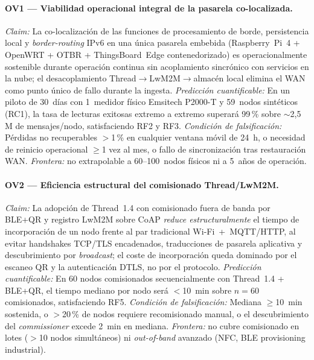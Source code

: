 \paragraph{OV1 --- Viabilidad operacional integral de la pasarela co-localizada.}
\emph{Claim:} La co-localización de las funciones de procesamiento de borde, persistencia local y \emph{border-routing} IPv6 en una única pasarela embebida (Raspberry~Pi~4 + OpenWRT + OTBR + ThingsBoard~Edge contenedorizado) es operacionalmente sostenible durante operación continua sin acoplamiento sincrónico con servicios en la nube; el desacoplamiento Thread$\rightarrow$LwM2M$\rightarrow$almacén local elimina el WAN como punto único de fallo durante la ingesta.
\emph{Predicción cuantificable:} En un piloto de 30~días con 1~medidor físico Emsitech P2000-T y 59~nodos sintéticos (RC1), la tasa de lecturas exitosas extremo a extremo superará 99\,\% sobre $\sim$2{,}5\,M de mensajes/nodo, satisfaciendo RF2 y RF3.
\emph{Condición de falsificación:} Pérdidas no recuperables $>$1\,\% en cualquier ventana móvil de 24~h, o necesidad de reinicio operacional $\geq$1 vez al mes, o fallo de sincronización tras restauración WAN. \emph{Frontera:} no extrapolable a 60--100~nodos físicos ni a 5~años de operación.

\paragraph{OV2 --- Eficiencia estructural del comisionado Thread/LwM2M.}
\emph{Claim:} La adopción de Thread~1.4 con comisionado fuera de banda por BLE+QR y registro LwM2M sobre CoAP \emph{reduce estructuralmente} el tiempo de incorporación de un nodo frente al par tradicional Wi-Fi~+~MQTT/HTTP, al evitar handshakes TCP/TLS encadenados, traducciones de pasarela aplicativa y descubrimiento por \emph{broadcast}; el coste de incorporación queda dominado por el escaneo QR y la autenticación DTLS, no por el protocolo.
\emph{Predicción cuantificable:} En 60 nodos comisionados secuencialmente con Thread~1.4 + BLE+QR, el tiempo mediano por nodo será $<$10~min sobre $n=60$ comisionados, satisfaciendo RF5.
\emph{Condición de falsificación:} Mediana $\geq$10~min sostenida, o $>$20\,\% de nodos requiere recomisionado manual, o el descubrimiento del \emph{commissioner} excede 2~min en mediana. \emph{Frontera:} no cubre comisionado en lotes ($>$10 nodos simultáneos) ni \emph{out-of-band} avanzado (NFC, BLE provisioning industrial).

